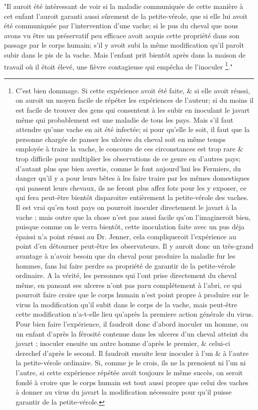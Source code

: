 "Il auroit été intéressant de voir si la maladie communiquée de cette manière à cet enfant l'auroit garanti aussi sûrement de la petite-vérole, que si elle lui avoit été communiquée par l'intervention d'une vache; si le pus du cheval que nous avons vu être un préservatif peu efficace avoit acquis cette propriété dans son passage par le corps humain; s'il y avoit subi la même modification qu'il paroît subir dans le pis de la vache. Mais l'enfant prit bientôt après dans la maison de travail où il étoit élevé, une fièvre contagieuse qui empêcha de l'inoculer \footnote{C'est bien dommage. Si cette expérience avoit été faite, & si elle avoit réussi, on auroit un moyen facile de répéter les expériences de l'auteur; si du moins il est facile de trouver des gens qui consentent à les subir en inoculant le javart même qui probablement est une maladie de tous les pays. Mais s'il faut attendre qu'une vache en ait été infectée; si pour qu'elle le soit, il faut que la personne chargée de panser les ulcères du cheval soit en même temps employée à traire la vache, le concours de ces circonstances est trop rare & trop difficile pour multiplier les observations de ce genre en d'autres pays; d'autant plus que bien avertis, comme le font aujourd'hui les Fermiers, du danger qu'il y a pour leurs bêtes à les faire traire par les mêmes domestiques qui pansent leurs chevaux, ils ne feront plus affez fots pour les y exposer, ce qui fera peut-être bientôt disparoitre entièrement la petite-vérole des vaches. Il est vrai qu'en tout pays on pourroit inoculer directement le javart à la vache ; mais outre que la chose n'est pas aussi facile qu'on l'imagineroit bien, puisque comme on le verra bientôt, cette inoculation faite avec un pus déja épaissi n'a point réussi au Dr. Jenner, cela compliqueroit l'expérience au point d'en détourner peut-être les observateurs. Il y auroit donc un très-grand avantage à n'avoir besoin que du cheval pour produire la maladie fur les hommes, fans lui faire perdre sa propriété de garantir de la petite-vérole ordinaire. A la vérité, les personnes qui l'ont prise directement du cheval même, en pansant ses ulceres n'ont pas paru complétement à l'abri, ce qui pourroit faire croire que le corps humain n'est point propre à produire sur le virus la modification qu'il subit dans le corps de la vache, mais peut-être cette modification n'a-t-elle lieu qu'après la premiere action générale du virus. Pour bien faire l'expérience, il faudroit donc d'abord inoculer un homme, ou un enfant d'après la férosité contenue dans les ulceres d'un cheval atteint du javart ; inoculer ensuite un autre homme d'après le premier, & celui-ci derechef d'après le second. Il faudroit ensuite leur inoculer à l'un & à l'autre la petite-vérole ordinaire. Si, comme je le crois, ils ne la prenoient ni l'un ni l'autre, si cette expérience répétée avoit toujours le même succès, on seroit fondé à croire que le corps humain est tout aussi propre que celui des vaches à donner au virus du javart la modification nécessaire pour qu'il puisse garantir de la petite-vérole.}."
